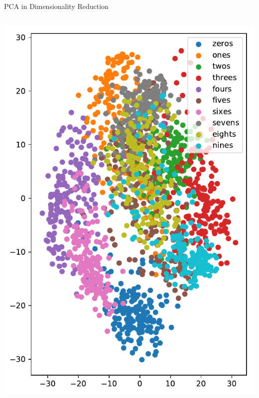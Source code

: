 \documentclass[10pt, aspectratio=169]{beamer} %
\begin{document}
\begin{frame}[fragile, allowframebreaks=0.8]{PCA in Dimensionality Reduction}
\begin{columns}
		\begin{center}
			\includegraphics[width=\columnwidth]{digits_pca_proj.pdf}
		\end{center}
		\end{columns}
\end{frame}
\end{document}
